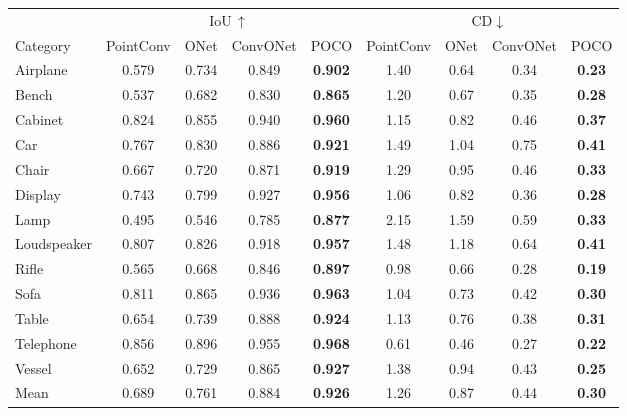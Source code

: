 \documentclass[10pt,twocolumn,letterpaper]{article}
\newcommand\OURS{{POCO}}
\begin{document}
\begin{table*}[h!]
    \centering
    \begin{tabular}{l|cccc|cccc}
                    & \multicolumn{4}{c|}{IoU\,$\uparrow$} & \multicolumn{4}{c}{CD$\downarrow$}\\[1mm] 
        Category    & PointConv & ONet & \!ConvONet\! & \OURS & PointConv & ONet & \!ConvONet\! & \OURS \\
        \midrule
        Airplane    & 0.579 & 0.734 & 0.849 & \bf 0.902 & 1.40 & 0.64 & 0.34 & \bf 0.23	\\
        Bench       & 0.537 & 0.682 & 0.830 & \bf 0.865 & 1.20 & 0.67 & 0.35 & \bf 0.28\\
        Cabinet     & 0.824 & 0.855 & 0.940 & \bf 0.960 & 1.15 & 0.82 & 0.46 & \bf 0.37\\
        Car         & 0.767 & 0.830 & 0.886 & \bf 0.921	& 1.49 & 1.04 & 0.75 & \bf 0.41\\
        Chair       & 0.667 & 0.720 & 0.871 & \bf 0.919	& 1.29 & 0.95 & 0.46 & \bf 0.33\\
        Display     & 0.743 & 0.799 & 0.927 & \bf 0.956	& 1.06 & 0.82 & 0.36 & \bf 0.28\\
        Lamp        & 0.495 & 0.546 & 0.785 & \bf 0.877	& 2.15 & 1.59 & 0.59 & \bf 0.33\\
        Loudspeaker & 0.807 & 0.826 & 0.918 & \bf 0.957	& 1.48 & 1.18 & 0.64 & \bf 0.41\\
        Rifle       & 0.565 & 0.668 & 0.846 & \bf 0.897	& 0.98 & 0.66 & 0.28 & \bf 0.19\\
        Sofa        & 0.811 & 0.865 & 0.936 & \bf 0.963	& 1.04 & 0.73 & 0.42 & \bf 0.30\\
        Table       & 0.654 & 0.739 & 0.888 & \bf 0.924	& 1.13 & 0.76 & 0.38 & \bf 0.31\\
        Telephone   & 0.856 & 0.896 & 0.955 & \bf 0.968	& 0.61 & 0.46 & 0.27 & \bf 0.22\\
        Vessel      & 0.652 & 0.729 & 0.865 & \bf 0.927	& 1.38 & 0.94 & 0.43 & \bf 0.25\\
        \midrule
        Mean        & 0.689 & 0.761 & 0.884 & \bf 0.926	& 1.26 & 0.87 & 0.44 & \bf 0.30\\
    \end{tabular}
    
    \bigskip
    

\end{table*}
\end{document}
